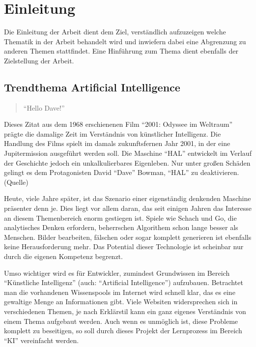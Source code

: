 \section{Einleitung}

Die Einleitung der Arbeit dient dem Ziel, verständlich aufzuzeigen welche Thematik in der Arbeit behandelt wird und inwiefern dabei eine Abgrenzung zu anderen Themen stattfindet. Eine Hinführung zum Thema dient ebenfalls der Zielstellung der Arbeit.

\subsection{Trendthema Artificial Intelligence}

\begin{quote}
"`Hello Dave!"'
\end{quote}

Dieses Zitat aus dem 1968 erschienenen Film "`2001: Odyssee im Weltraum"' prägte die damalige Zeit im Verständnis von künstlicher Intelligenz. Die Handlung des Films spielt im damals zukunftsfernen Jahr 2001, in der eine Jupitermission ausgeführt werden soll. Die Maschine "`HAL"' entwickelt im Verlauf der Geschichte jedoch ein unkalkulierbares Eigenleben. Nur unter großen Schäden gelingt es dem Protagonisten David "`Dave"' Bowman, "`HAL"' zu deaktivieren. (Quelle)

Heute, viele Jahre später, ist das Szenario einer eigenständig denkenden Maschine präsenter denn je. Dies liegt vor allem daran, das seit einigen Jahren das Interesse an diesem Themenbereich enorm gestiegen ist. Spiele wie Schach und Go, die analytisches Denken erfordern, beherrschen Algorithem schon lange besser als Menschen. Bilder bearbeiten, fälschen oder sogar komplett generieren ist ebenfalls keine Herausforderung mehr. Das Potential dieser Technologie ist scheinbar nur durch die eigenen Kompetenz begrenzt. 

Umso wichtiger wird es für Entwickler, zumindest Grundwissen im Bereich "`Künstliche Intelligenz"' (auch: "`Artificial Intelligence"') aufzubauen. Betrachtet man die vorhandenen Wissenspools im Internet wird schnell klar, das es eine gewaltige Menge an Informationen gibt. Viele Websiten widersprechen sich in verschiedenen Themen, je nach Erklärstil kann ein ganz eigenes Verständnis von einem Thema aufgebaut werden. Auch wenn es unmöglich ist, diese Probleme komplett zu beseitigen, so soll durch dieses Projekt der Lernprozess im Bereich "`KI"' vereinfacht werden.

